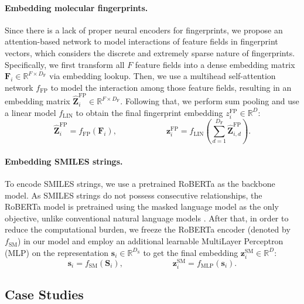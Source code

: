 \paragraph{Embedding molecular fingerprints.}
Since there is a lack of proper neural encoders for fingerprints, we propose an attention-based network to model interactions of feature fields in fingerprint vectors, which considers the discrete and extremely sparse nature of fingerprints.
Specifically, we first transform all \(F\) feature fields into a dense embedding matrix \(\bm{F}_i \in \mathbb{R}^{F \times D_\text{F}}\) via embedding lookup.
Then, we use a multihead self-attention network \(f_\text{FP}\) \cite{Vaswani:2017ul} to model the interaction among those feature fields, resulting in an embedding matrix \(\widehat{\bm{Z}}^\text{FP}_i \in \mathbb{R}^{F \times D_\text{F}}\).
Following that, we perform sum pooling and use a linear model \(f_\text{LIN}\) to obtain the final fingerprint embedding \(z^\text{FP}_i \in \mathbb{R}^{D}\):
\begin{equation}
	\widehat{\bm{Z}}^\text{FP}_i = f_\text{FP}(\bm{F}_i), \qquad\qquad\qquad \bm{z}^\text{FP}_i = f_\text{LIN} \left(\sum_{d=1}^{D_\text{F}} \widehat{\bm{Z}}^\text{FP}_{i,d}\right).
\end{equation}

\paragraph{Embedding SMILES strings.}

To encode SMILES strings, we use a pretrained RoBERTa \cite{Liu:2019dd} as the backbone model.
As SMILES strings do not possess consecutive relationships, the RoBERTa model is pretrained using the masked language model as the only objective, unlike conventional natural language models \cite{Devlin:2019uk}.
After that, in order to reduce the computational burden, we freeze the RoBERTa encoder (denoted by \(f_\text{SM}\)) in our model and employ an additional learnable MultiLayer Perceptron (MLP) on the representation \(\bm{s}_i \in \mathbb{R}^{D_\text{S}}\) to get the final embedding \(\bm{z}^\text{SM}_i \in \mathbb{R}^{D}\):
\begin{equation}
	\bm{s}_i = f_\text{SM}(\mathbf{S}_i), \qquad\qquad\qquad \bm{z}^\text{SM}_i = f_\text{MLP}(\bm{s}_i).
\end{equation}

\subsection{Case Studies}


